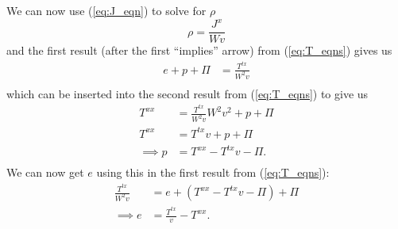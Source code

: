 \documentclass[12pt]{article}
\numberwithin{equation}{section}
\begin{document}
We can now use (\ref{eq:J_eqn}) to solve for $\rho$
\begin{equation}
\rho = \frac{J^x}{W v}
\end{equation}
and the first result (after the first ``implies'' arrow) from (\ref{eq:T_eqns}) gives us
\begin{equation}
\begin{aligned}
e + p + \Pi &= \frac{T^{tx}}{W^2 v} \\
\end{aligned}
\end{equation}
which can be inserted into the second result from (\ref{eq:T_eqns}) to give us
\begin{equation} \label{eq:intermediate_p}
\begin{aligned}
T^{xx} &= \frac{T^{tx}}{W^2 v} W^2 v^2 + p + \Pi \\
T^{xx} &= T^{tx} v + p + \Pi \\
\implies p &= T^{xx} - T^{tx} v - \Pi. \\
\end{aligned}
\end{equation}
We can now get $e$ using this in the first result from (\ref{eq:T_eqns}):
\begin{equation}
\begin{aligned}
\frac{T^{tx}}{W^2 v} &= e + (T^{xx} - T^{tx} v - \Pi) + \Pi \\
\implies e &= \frac{T^{tx}}{v} - T^{xx}. \\
\end{aligned}
\end{equation}
\end{document}
